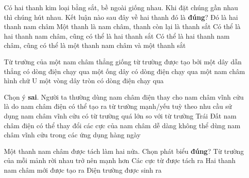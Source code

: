 \begin{ex}
	Có hai thanh kim loại bằng sắt, bề ngoài giống nhau. Khi đặt chúng gần nhau thì chúng hút nhau. Kết luận nào sau đây về hai thanh đó là \textbf{đúng}?
	\choice
	{Đó là hai thanh nam châm}
	{Một thanh là nam châm, thanh còn lại là thanh sắt}
	{Có thể là hai thanh nam châm, cũng có thể là hai thanh sắt}
	{\True Có thể là hai thanh nam châm, cũng có thể là một thanh nam châm và một thanh sắt}
	\loigiai{}
\end{ex}
\begin{ex}
	Từ trường của một nam châm thẳng giống từ trường được tạo bởi
	\choice
	{một dây dẫn thẳng có dòng điện chạy qua}
	{\True một ống dây có dòng điện chạy qua}
	{một nam châm hình chữ U}
	{một vòng dây tròn có dòng điện chạy qua}
	\loigiai{}
\end{ex}
\begin{ex}
	Chọn ý \textbf{sai}. Người ta thường dùng nam châm điện thay cho nam châm vĩnh cửu là do
	\choice
	{nam châm điện có thể tạo ra từ trường mạnh/yếu tuỳ theo nhu cầu sử dụng}
	{\True nam châm vĩnh cửu có từ trường quá lớn so với từ trường Trái Đất}
	{nam châm điện có thể thay đổi các cực của nam châm dễ dàng}
	{không thể dùng nam châm vĩnh cửu trong các ứng dụng hàng ngày}
	\loigiai{}
\end{ex}
\begin{ex}
	Một thanh nam châm được tách làm hai nửa. Chọn phát biểu \textbf{đúng}?
	\choice
	{Từ trường của mỗi mảnh rời nhau trở nên mạnh hơn}
	{Các cực từ được tách ra}
	{\True Hai thanh nam châm mới được tạo ra}
	{Điện trường được sinh ra}
	\loigiai{}
\end{ex}

